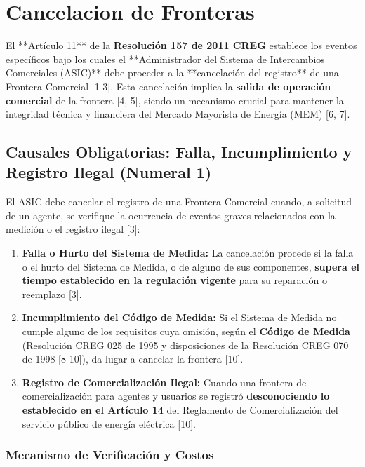 \documentclass[a5paper]{book}%
\begin{document}
  
  
  \section{Cancelacion de Fronteras}
  
  El **Artículo 11** de la \textbf{Resolución 157 de 2011 CREG} establece los eventos específicos bajo los cuales el **Administrador del Sistema de Intercambios Comerciales (ASIC)** debe proceder a la **cancelación del registro** de una Frontera Comercial [1-3]. Esta cancelación implica la \textbf{salida de operación comercial} de la frontera [4, 5], siendo un mecanismo crucial para mantener la integridad técnica y financiera del Mercado Mayorista de Energía (MEM) [6, 7].
  
  \subsection{Causales Obligatorias: Falla, Incumplimiento y Registro Ilegal (Numeral 1)}
  
  El ASIC debe cancelar el registro de una Frontera Comercial cuando, a solicitud de un agente, se verifique la ocurrencia de eventos graves relacionados con la medición o el registro ilegal [3]:
  
  \begin{enumerate}
  	\item \textbf{Falla o Hurto del Sistema de Medida:} La cancelación procede si la falla o el hurto del Sistema de Medida, o de alguno de sus componentes, \textbf{supera el tiempo establecido en la regulación vigente} para su reparación o reemplazo [3].
  	\item \textbf{Incumplimiento del Código de Medida:} Si el Sistema de Medida no cumple alguno de los requisitos cuya omisión, según el \textbf{Código de Medida} (Resolución CREG 025 de 1995 y disposiciones de la Resolución CREG 070 de 1998 [8-10]), da lugar a cancelar la frontera [10].
  	\item \textbf{Registro de Comercialización Ilegal:} Cuando una frontera de comercialización para agentes y usuarios se registró \textbf{desconociendo lo establecido en el Artículo 14} del Reglamento de Comercialización del servicio público de energía eléctrica [10].
  \end{enumerate}
  
  \subsubsection{Mecanismo de Verificación y Costos}
  
\end{document}
